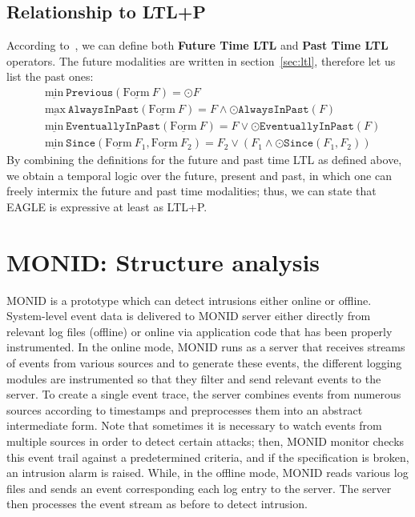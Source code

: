 \documentclass[english]{article}
\begin{document}
\subsection{Relationship to LTL+P}
According to~\cite{barringer2004rule,barringer2003eagle}, we can define both \textbf{Future Time LTL} and \textbf{Past Time LTL} operators. The future modalities are written in section~\ref{sec:ltl}, therefore let us list the past ones:
\begin{align*}
    & \underline{\text{min}}\ \mathtt{Previous}(\underline{\text{Form}}\ F) = \odot F \\
    & \underline{\text{max}}\ \mathtt{AlwaysInPast}(\underline{\text{Form}}\ F) = F \land \odot \mathtt{AlwaysInPast}(F) \\
    & \underline{\text{min}}\ \mathtt{EventuallyInPast}(\underline{\text{Form}}\ F) = F \lor \odot \mathtt{EventuallyInPast}(F) \\
    & \underline{\text{min}}\ \mathtt{Since}(\underline{\text{Form}}\ F_1, \underline{\text{Form}}\ F_2) = F_2 \lor (F_1 \land \odot \mathtt{Since}(F_1,F_2))
\end{align*}
By combining the definitions for the future and past time LTL as defined above, we obtain a temporal logic over the future, present and past, in which one can freely intermix the future and past time modalities; thus, we can state that EAGLE is expressive at least as LTL+P.

\section{MONID: Structure analysis}
MONID is a prototype which can detect intrusions either online or offline. System-level event data is delivered to MONID server either directly from relevant log files (offline) or online via application code that has been properly instrumented. In the online mode, MONID runs as a server that receives streams of events from various sources and to generate these events, the different logging modules are instrumented so that they filter and send relevant events to the server.
To create a single event trace, the server combines events from numerous sources according to timestamps and preprocesses them into an abstract intermediate form. Note that sometimes it is necessary to watch events from multiple sources in order to detect certain attacks; then, MONID monitor checks this event trail against a predetermined criteria, and if the specification is broken, an intrusion alarm is raised. While, in the offline mode, MONID reads various log files and sends an event corresponding each log entry to the server. The server then processes the event stream as before to detect intrusion.
\end{document}
